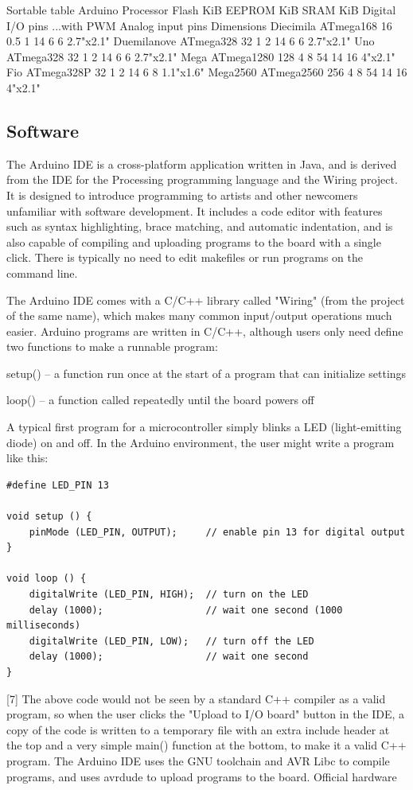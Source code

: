Sortable table
Arduino	Processor	Flash
KiB	EEPROM
KiB	SRAM
KiB	Digital I/O
pins	...with
PWM	Analog input
pins	Dimensions
Diecimila	ATmega168	16	0.5	1	14	6	6	2.7"x2.1"
Duemilanove	ATmega328	32	1	2	14	6	6	2.7"x2.1"
Uno	ATmega328	32	1	2	14	6	6	2.7"x2.1"
Mega	ATmega1280	128	4	8	54	14	16	4"x2.1"
Fio	ATmega328P	32	1	2	14	6	8	1.1"x1.6"
Mega2560	ATmega2560	256	4	8	54	14	16	4"x2.1"

\subsection{Software}

The Arduino IDE is a cross-platform application written in Java, and is derived from the IDE for the Processing programming language and the Wiring project. It is designed to introduce programming to artists and other newcomers unfamiliar with software development. It includes a code editor with features such as syntax highlighting, brace matching, and automatic indentation, and is also capable of compiling and uploading programs to the board with a single click. There is typically no need to edit makefiles or run programs on the command line.

The Arduino IDE comes with a C/C++ library called "Wiring" (from the project of the same name), which makes many common input/output operations much easier. Arduino programs are written in C/C++, although users only need define two functions to make a runnable program:

setup() – a function run once at the start of a program that can initialize settings

loop() – a function called repeatedly until the board powers off

A typical first program for a microcontroller simply blinks a LED (light-emitting diode) on and off. In the Arduino environment, the user might write a program like this:

\begin{verbatim}
#define LED_PIN 13
 
void setup () {
    pinMode (LED_PIN, OUTPUT);     // enable pin 13 for digital output
}
 
void loop () {
    digitalWrite (LED_PIN, HIGH);  // turn on the LED
    delay (1000);                  // wait one second (1000 milliseconds)
    digitalWrite (LED_PIN, LOW);   // turn off the LED
    delay (1000);                  // wait one second
}
\end{verbatim}

[7]
The above code would not be seen by a standard C++ compiler as a valid program, so when the user clicks the "Upload to I/O board" button in the IDE, a copy of the code is written to a temporary file with an extra include header at the top and a very simple main() function at the bottom, to make it a valid C++ program.
The Arduino IDE uses the GNU toolchain and AVR Libc to compile programs, and uses avrdude to upload programs to the board.
Official hardware

